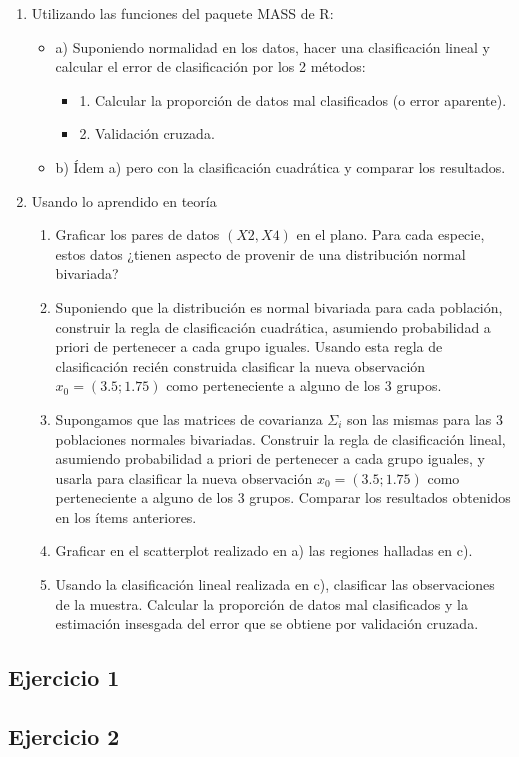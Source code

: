 \documentclass{estilo}
\begin{document}
\begin{enumerate} 
\item[\hyperlink{ej1}{1.}]Utilizando las funciones del paquete MASS de R:
\begin{itemize}
    \item a) Suponiendo normalidad en los datos, hacer una clasificación lineal y calcular el error de clasificación por los 2 métodos:
    \begin{itemize}
        \item 1. Calcular la proporción de datos mal clasificados (o error aparente).
        \item 2. Validación cruzada.
    \end{itemize}
    \item b) Ídem a) pero con la clasificación cuadrática y comparar los resultados. 
\end{itemize}

\item[\hyperlink{ej2}{2.}]Usando lo aprendido en teoría
    \begin{enumerate}
        \item  Graficar los pares de datos $(X2,X4)$ en el plano. Para cada especie, estos datos ¿tienen aspecto de provenir de una distribución normal bivariada?
        
        \item  Suponiendo que la distribución es normal bivariada para cada población, construir la regla de clasificación cuadrática, asumiendo probabilidad a priori de pertenecer a cada grupo iguales. Usando esta regla de clasificación recién construida clasificar la nueva observación $x_0 = (3.5 ; 1.75)$ como perteneciente a alguno de los 3 grupos.
        
        \item  Supongamos que las matrices de covarianza $\Sigma_i$ son las mismas para las 3 poblaciones normales bivariadas. Construir la regla de clasificación lineal, asumiendo probabilidad a priori de pertenecer a cada grupo iguales, y usarla para clasificar la nueva observación $x_0 = (3.5 ; 1.75)$ como perteneciente a alguno de los 3 grupos. Comparar los resultados obtenidos en los ítems anteriores.
        \item  Graficar en el scatterplot realizado en a) las regiones halladas en c).
        \item  Usando la clasificación lineal realizada en c), clasificar las observaciones de la muestra. Calcular la proporción de datos mal clasificados y la estimación insesgada del error que se obtiene por validación cruzada.
    \end{enumerate}
\end{enumerate}

\newpage

\hypertarget{ej1}{\subsection*{Ejercicio 1}}

\hypertarget{ej2}{\subsection*{Ejercicio 2}}

\end{document}
